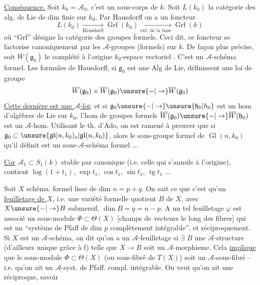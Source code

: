 \uline{Conséquence.} Soit $k_0=\mathcal A_0$, c'est un sous-corps de $k$. Soit $L(k_0)$ la catégorie des alg. de Lie de dim finie sur $k_0$. Par Hausdorff on a un foncteur
\[
L(k_0)\xrightarrow[\text{Hausdorff}]{}\operatorname{Grf}(k_0)\xrightarrow[\text{ext. de la base}]{}\operatorname{Grf}(k)
\]
où ``Grf'' désigne la catégorie des groupes formels.
Ceci dit, ce foncteur se factorise canoniquement par les $\mathcal A$-groupes (formels) sur $k$. De façon plus précise, soit $\overline W(\mathfrak g_0)$ le complété à l'origine  $k_0$-espace vectoriel . C'est un $\mathcal A$-schéma formel.
Les formules de Hausdorff, si $\mathfrak g_0$ est une Alg de Lie, définissent une loi de groupe
\[
\overline W(\mathfrak g_0)\times\overline W(\mathfrak g_0)\unsure{-|\to}\overline W(\mathfrak g_0)
\]
\uline{Cette dernière est une $\mathcal A$-loi};  et si
$\mathfrak g_0\unsure{-|\to}\unsure{\mathfrak h_0|h_0}$ est un hom d'algèbres de Lie sur $k_0$, l'hom de groupes formels $\overline W(\mathfrak g_0)\unsure{-|\to}\overline W(\mathfrak h_0)$ est un $\mathcal A$-hom.
Utilisant le th. d'Ado, on est ramené à prouver que si $\mathfrak g_0\subset\unsure{\mathfrak{gl}(n,k_0)_a|\mathfrak{gl}(n,k_0)}$, alors le sous-groupe formel de $\operatorname{Gl}(n,k_0)$ qu'il définit est un sous-$\mathcal A$-schéma formel $\ldots$
\margin{$-$}

\uline{Cor} $\mathcal A_1\subset S_1(k)$ stable par  canonique (i.e. celle qui s'annule à l'origine), contient $\log(1+t_1)$, $\exp t_1$, $\cos t_1$, $\sin t_1$, $\operatorname{tg}t_1$ $\ldots$

Soit $X$ schéma. formel lisse de dim $n=p+q$. On sait ce que c'est qu'un \uline{feuilletage de $X$}, i.e. une variété formelle quotient $B$ de $X$, avec $X\unsure{-|\to}B$ submersif, $\dim B=q=n-p$. A un tel feuilletage $\varphi$ est associé un sous-module $\Phi\subset\Theta(X)$ [champs de vecteurs le long des fibres] qui est un ``système de Pfaff de dim $p$ complètement intégrable'', et réciproquement. Si $X$ est un $\mathcal A$-schéma, on dit qu'on a un $\mathcal A$-feuilletage si $\exists$ $B$ une $\mathcal A$-structure (d'ailleurs unique\unsure{\}|)} grâce à f) telle que $X\longrightarrow B$ soit un $\mathcal A$-morphisme. Cela \uline{implique} que le sous-module $\Phi\subset\Theta(X)$ (ou sous-fibré de $T(X)$) soit un $\mathcal A$-sous-fibré -- i.e. qu'on ait un $\mathcal A$-syst. de Pfaff. compl. intégrable. On veut qu'on ait une réciproque, savoir

